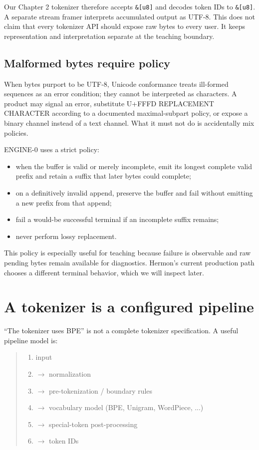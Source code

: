 Our Chapter 2 tokenizer therefore accepts \texttt{\&{[}u8{]}} and
decodes token IDs to \texttt{\&{[}u8{]}}. A separate stream framer
interprets accumulated output as UTF-8. This does not claim that every
tokenizer API should expose raw bytes to every user. It keeps
representation and interpretation separate at the teaching boundary.

\subsection{Malformed bytes require
policy}\label{malformed-bytes-require-policy}

When bytes purport to be UTF-8, Unicode conformance treats ill-formed
sequences as an error condition; they cannot be interpreted as
characters. A product may signal an error, substitute U+FFFD REPLACEMENT
CHARACTER according to a documented maximal-subpart policy, or expose a
binary channel instead of a text channel. What it must not do is
accidentally mix policies.

ENGINE-0 uses a strict policy:

\begin{itemize}
\tightlist
\item
  when the buffer is valid or merely incomplete, emit its longest
  complete valid prefix and retain a suffix that later bytes could
  complete;
\item
  on a definitively invalid append, preserve the buffer and fail without
  emitting a new prefix from that append;
\item
  fail a would-be successful terminal if an incomplete suffix remains;
\item
  never perform lossy replacement.
\end{itemize}

This policy is especially useful for teaching because failure is
observable and raw pending bytes remain available for diagnostics.
Hermon's current production path chooses a different terminal behavior,
which we will inspect later.

\section{A tokenizer is a configured
pipeline}\label{a-tokenizer-is-a-configured-pipeline}

``The tokenizer uses BPE'' is not a complete tokenizer specification. A
useful pipeline model is:

\begin{quote}
\begin{enumerate}
\item input
\item \(\longrightarrow\)  normalization
\item \(\longrightarrow\)  pre-tokenization / boundary rules
\item \(\longrightarrow\)  vocabulary model (BPE, Unigram, WordPiece, ...)
\item \(\longrightarrow\)  special-token post-processing
\item \(\longrightarrow\)  token IDs
\end{enumerate}
\end{quote}

